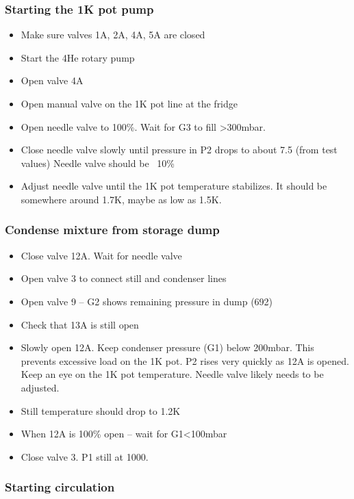 \subsubsection*{Starting the 1K pot pump}

\begin{itemize}
\item Make sure valves 1A, 2A, 4A, 5A are closed
\item Start the 4He rotary pump
\item Open valve 4A
\item Open manual valve on the 1K pot line at the fridge
\item Open needle valve to 100\%. Wait for G3 to fill >300mbar. 
\item Close needle valve slowly until pressure in P2 drops to about 7.5 (from test values) Needle valve should be ~10\%
\item Adjust needle valve until the 1K pot temperature stabilizes. It should be somewhere around 1.7K, maybe as low as 1.5K.
\end{itemize}

\subsubsection*{Condense mixture from storage dump}
\begin{itemize}
\item Close valve 12A. Wait for needle valve
\item Open valve 3 to connect still and condenser lines
\item Open valve 9 – G2 shows remaining pressure in dump (692)
\item Check that 13A is still open
\item Slowly open 12A. Keep condenser pressure (G1) below 200mbar. This prevents excessive load on the 1K pot. P2 rises very quickly as 12A is opened. Keep an eye on the 1K pot temperature. Needle valve likely needs to be adjusted.
\item Still temperature should drop to 1.2K
\item When 12A is 100\% open – wait for G1<100mbar
\item Close valve 3. P1 still at 1000.
\end{itemize}

\subsubsection*{Starting circulation}

